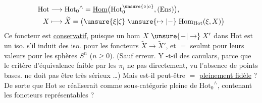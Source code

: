 \[
\begin{aligned}
\mathrm{Hot}&\longrightarrow {\mathrm{Hot}_0}^{\wedge}=\underline{\mathrm{Hom}}\bigl(\mathrm{Hot}_0^{\unsure{\circ|o}},(\mathrm{Ens})\bigr),\\
X&\longmapsto\widetilde X=\bigl(\unsure{\xi|\zeta}\mathrel{\unsure{\mapsto|-}}\mathrm{Hom}_{\mathrm{Hot}}(\xi,X)\bigr)
\end{aligned}
\]
Ce foncteur est \uline{conservatif}, puisque un hom
$X\mathrel{\unsure{-|\to}}X'$ dans $\mathrm{Hot}$ est un iso. s'il induit des
iso. pour les foncteurs $\widetilde X\to\widetilde X'$, et $=$ seulmt
pour leurs valeurs pour les sphères $S^n$ ($n\geq 0$).
(Sauf erreur.  Y -t-il des canulars,
parce que le  critère d'équivalence faible par
les $\pi_i$ ne   pas directement, vu l'absence
de points bases.  ne doit pas être très sérieux
\ldots)  Mais est-il peut-être $=$ \uline{pleinement fidèle} ?
De sorte que $\mathrm{Hot}$ se réaliserait comme sous-catégorie pleine de $ {\mathrm{Hot}_0}^{\wedge}$, contenant les
foncteurs représentables ? 
